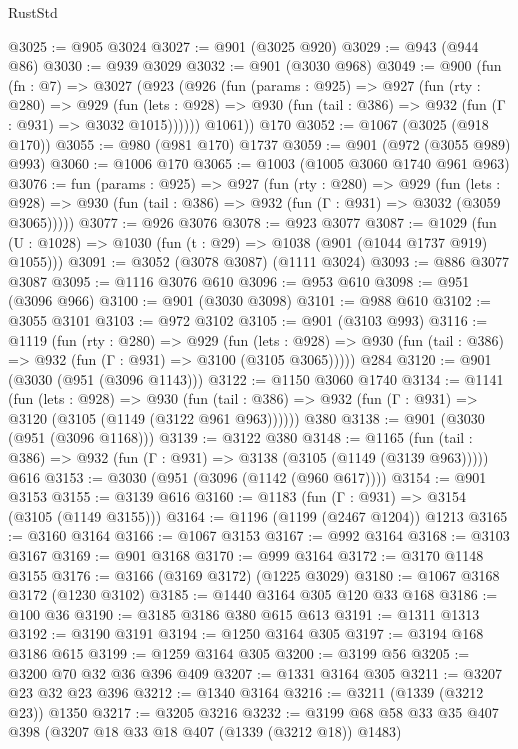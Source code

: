 \begin{lexlean}{RustStd}
\begin{coremodule}
@3025 := @905 @3024
@3027 := @901 (@3025 @920)
@3029 := @943 (@944 @86)
@3030 := @939 @3029
@3032 := @901 (@3030 @968)
@3049 := @900
    (fun (fn : @7) =>
    @3027
      (@923
        (@926
          (fun (params : @925) =>
          @927
            (fun (rty : @280) =>
            @929
              (fun (lets : @928) =>
              @930 (fun (tail : @386) => @932 (fun (Γ : @931) => @3032 @1015))))))
        @1061))
    @170
@3052 := @1067 (@3025 (@918 @170))
@3055 := @980 (@981 @170) @1737
@3059 := @901 (@972 (@3055 @989) @993)
@3060 := @1006 @170
@3065 := @1003 (@1005 @3060 @1740 @961 @963)
@3076 := fun (params : @925) =>
  @927
    (fun (rty : @280) =>
    @929
      (fun (lets : @928) =>
      @930 (fun (tail : @386) => @932 (fun (Γ : @931) => @3032 (@3059 @3065)))))
@3077 := @926 @3076
@3078 := @923 @3077
@3087 := @1029 (fun (U : @1028) => @1030 (fun (t : @29) => @1038 (@901 (@1044 @1737 @919) @1055)))
@3091 := @3052 (@3078 @3087) (@1111 @3024)
@3093 := @886 @3077 @3087
@3095 := @1116 @3076 @610
@3096 := @953 @610
@3098 := @951 (@3096 @966)
@3100 := @901 (@3030 @3098)
@3101 := @988 @610
@3102 := @3055 @3101
@3103 := @972 @3102
@3105 := @901 (@3103 @993)
@3116 := @1119
    (fun (rty : @280) =>
    @929
      (fun (lets : @928) =>
      @930 (fun (tail : @386) => @932 (fun (Γ : @931) => @3100 (@3105 @3065)))))
    @284
@3120 := @901 (@3030 (@951 (@3096 @1143)))
@3122 := @1150 @3060 @1740
@3134 := @1141
    (fun (lets : @928) =>
    @930 (fun (tail : @386) => @932 (fun (Γ : @931) => @3120 (@3105 (@1149 (@3122 @961 @963))))))
    @380
@3138 := @901 (@3030 (@951 (@3096 @1168)))
@3139 := @3122 @380
@3148 := @1165
    (fun (tail : @386) => @932 (fun (Γ : @931) => @3138 (@3105 (@1149 (@3139 @963)))))
    @616
@3153 := @3030 (@951 (@3096 (@1142 (@960 @617))))
@3154 := @901 @3153
@3155 := @3139 @616
@3160 := @1183 (fun (Γ : @931) => @3154 (@3105 (@1149 @3155)))
@3164 := @1196 (@1199 (@2467 @1204)) @1213
@3165 := @3160 @3164
@3166 := @1067 @3153
@3167 := @992 @3164
@3168 := @3103 @3167
@3169 := @901 @3168
@3170 := @999 @3164
@3172 := @3170 @1148 @3155
@3176 := @3166 (@3169 @3172) (@1225 @3029)
@3180 := @1067 @3168 @3172 (@1230 @3102)
@3185 := @1440 @3164 @305 @120 @33 @168
@3186 := @100 @36
@3190 := @3185 @3186 @380 @615 @613
@3191 := @1311 @1313
@3192 := @3190 @3191
@3194 := @1250 @3164 @305
@3197 := @3194 @168 @3186 @615
@3199 := @1259 @3164 @305
@3200 := @3199 @56
@3205 := @3200 @70 @32 @36 @396 @409
@3207 := @1331 @3164 @305
@3211 := @3207 @23 @32 @23 @396
@3212 := @1340 @3164
@3216 := @3211 (@1339 (@3212 @23)) @1350
@3217 := @3205 @3216
@3232 := @3199 @68 @58 @33 @35 @407 @398 (@3207 @18 @33 @18 @407 (@1339 (@3212 @18)) @1483)

\end{coremodule}
\end{lexlean}
